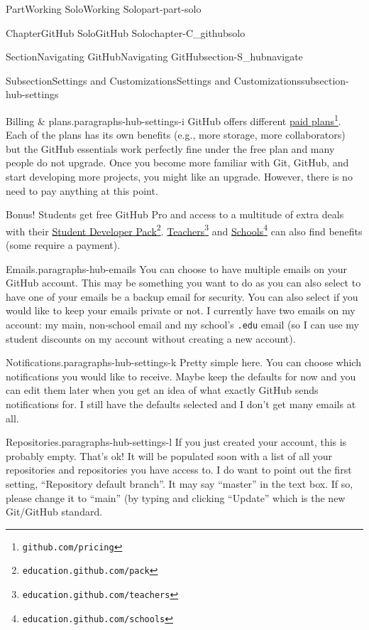 \documentclass[twoside,10pt,]{book}
\newcommand{\mono}[1]{\texttt{#1}}
\begin{document}
\begin{partptx}{Part}{Working Solo}{}{Working Solo}{}{}{part-part-solo}
\begin{chapterptx}{Chapter}{GitHub Solo}{}{GitHub Solo}{}{}{chapter-C_githubsolo}
\begin{sectionptx}{Section}{Navigating GitHub}{}{Navigating GitHub}{}{}{section-S_hubnavigate}
\begin{subsectionptx}{Subsection}{Settings and Customizations}{}{Settings and Customizations}{}{}{subsection-hub-settings}
\begin{paragraphs}{Billing \& plans.}{paragraphs-hub-settings-i}
GitHub offers different \href{https://github.com/pricing}{paid plans}\footnote{\nolinkurl{github.com/pricing}\label{fn-hub-settings-i-c-b}}. Each of the plans has its own benefits (e.g., more storage, more collaborators) but the GitHub essentials work perfectly fine under the free plan and many people do not upgrade. Once you become more familiar with Git, GitHub, and start developing more projects, you might like an upgrade. However, there is no need to pay anything at this point.%
\par
Bonus! Students get free GitHub Pro and access to a multitude of extra deals with their \href{https://education.github.com/pack}{Student Developer Pack}\footnote{\nolinkurl{education.github.com/pack}\label{fn-hub-settings-i-d-b}}. \href{https://education.github.com/teachers}{Teachers}\footnote{\nolinkurl{education.github.com/teachers}\label{fn-hub-settings-i-d-d}} and \href{https://education.github.com/schools}{Schools}\footnote{\nolinkurl{education.github.com/schools}\label{fn-hub-settings-i-d-f}} can also find benefits (some require a payment).%
\end{paragraphs}%
\begin{paragraphs}{Emails.}{paragraphs-hub-emails}%
%
You can choose to have multiple emails on your GitHub account. This may be something you want to do as you can also select to have one of your emails be a backup email for security. You can also select if you would like to keep your emails private or not. I currently have two emails on my account: my main, non-school email and my school's \mono{.edu} email (so I can use my student discounts on my account without creating a new account).%
\end{paragraphs}%
\begin{paragraphs}{Notifications.}{paragraphs-hub-settings-k}%
%
Pretty simple here. You can choose which notifications you would like to receive. Maybe keep the defaults for now and you can edit them later when you get an idea of what exactly GitHub sends notifications for. I still have the defaults selected and I don't get many emails at all.%
\end{paragraphs}%
\begin{paragraphs}{Repositories.}{paragraphs-hub-settings-l}%
%
%
If you just created your account, this is probably empty. That's ok! It will be populated soon with a list of all your repositories and repositories you have access to. I do want to point out the first setting, ``Repository default branch''. It may say ``master'' in the text box. If so, please change it to ``main'' (by typing and clicking ``Update'' which is the new Git\slash{}GitHub standard.%

\end{paragraphs}
\end{subsectionptx}
\end{sectionptx}
\end{chapterptx}
\end{partptx}
\end{document}
